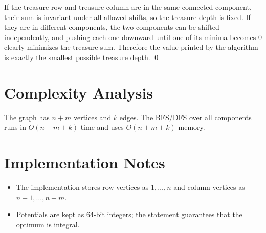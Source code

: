 \documentclass[11pt]{article}
\begin{document}
If the treasure row and treasure column are in the same connected component, their sum is invariant under
all allowed shifts, so the treasure depth is fixed.
If they are in different components, the two components can be shifted independently, and pushing each
one downward until one of its minima becomes $0$ clearly minimizes the treasure sum.
Therefore the value printed by the algorithm is exactly the smallest possible treasure depth. \qed

\section*{Complexity Analysis}

The graph has $n+m$ vertices and $k$ edges. The BFS/DFS over all components runs in $O(n+m+k)$
time and uses $O(n+m+k)$ memory.

\section*{Implementation Notes}

\begin{itemize}[leftmargin=*]
    \item The implementation stores row vertices as $1,\dots,n$ and column vertices as $n+1,\dots,n+m$.
    \item Potentials are kept as 64-bit integers; the statement guarantees that the optimum is integral.
\end{itemize}
\end{document}
